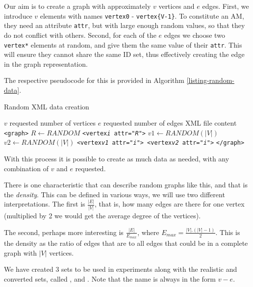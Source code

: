 Our aim is to create a graph with approximately $v$ vertices and $e$ edges. First, we introduce $v$ elements with names \texttt{vertex0} - \texttt{vertex\{V-1\}}. To constitute an AM, they need an attribute \texttt{attr}, but with large enough random values, so that they do not conflict with others. Second, for each of the $e$ edges we choose two \texttt{vertex*} elements at random, and give them the same value of their \texttt{attr}. This will ensure they cannot share the same ID set, thus effectively creating the edge in the graph representation.

The respective pseudocode for this is provided in Algorithm \ref{listing-random-data}.

\begin{algorithm}
\caption{Random XML data creation}
\label{listing-random-data}
\begin{algorithmic}
\REQUIRE $v$ requested number of vertices
\REQUIRE $e$ requested number of edges
\ENSURE XML file content
\PRINT \texttt{<graph>}
	\STATE $R \gets RANDOM$
	\PRINT \texttt{<vertex\textit{i} attr="\textit{R}">}
\ENDFOR
{}
	\STATE $v1 \gets RANDOM(|V|)$
	\STATE $v2 \gets RANDOM(|V|)$
	\PRINT \texttt{<vertex\textit{v1} attr="\textit{i}"> <vertex\textit{v2} attr="\textit{i}">}
\ENDFOR
\PRINT \texttt{</graph>}
\RETURN
\end{algorithmic}
\end{algorithm}

With this process it is possible to create as much data as needed, with any combination of $v$ and $e$ requested.

There is one characteristic that can describe random graphs like this, and that is the \textit{density}. This can be defined in various ways, we will use two different interpretations. The first is $\frac{|E|}{|V|}$, that is, how many edges are there for one vertex (multiplied by 2 we would get the average degree of the vertices).

The second, perhaps more interesting is $\frac{|E|}{E_{max}}$, where $E_{max} = \frac{|V|.(|V|-1)}{2}$. This is the density as the ratio of edges that are to all edges that could be in a complete graph with $|V|$ vertices.

We have created 3 sets to be used in experiments along with the realistic and converted sets, called ,  and . Note that the name is always in the form $v-e$.\\

